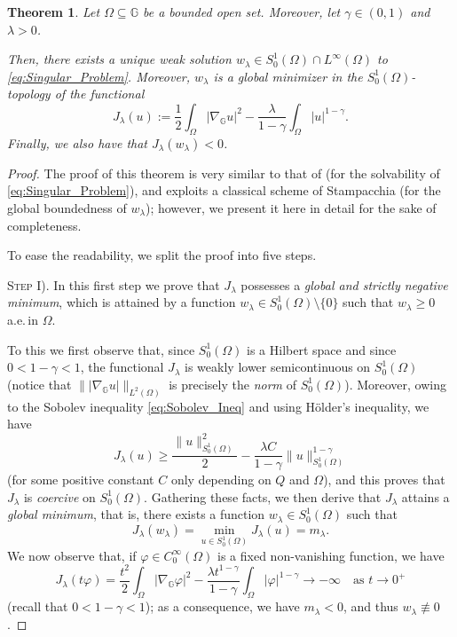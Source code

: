 \documentclass[11pt]{amsart}
\numberwithin{equation}{section} %
\newtheorem{teo}{Theorem}[section]
\theoremstyle{definition}
\begin{document}
\begin{teo}\label{thm:Singular_Problem}
	Let $\Omega\subseteq\mathbb{G}$
	be a bounded open set. Moreover, let $\gamma \in (0,1)$ and $\lambda >0$. 
	
	Then, there exists a unique weak solution $w_{\lambda} \in S^{1}_{0}(\Omega) \cap L^{\infty}(\Omega)$ to \eqref{eq:Singular_Problem}. Moreover, $w_{\lambda}$ is a global minimizer in the $S^{1}_{0}(\Omega)$-topology
	of the functional 
		\begin{equation}\label{eq:def_Functional_Singular}
			J_{\lambda}(u):= \dfrac{1}{2}\int_{\Omega}|\nabla_{\mathbb{G}}u|^{2} 
			-\dfrac{\lambda}{1-\gamma} \int_{\Omega}|u|^{1-\gamma}.
		\end{equation}
		Finally, we also have that $J_{\lambda}(w_{\lambda})<0$.
   \end{teo}
		\begin{proof}
		The proof of this theorem is very similar
		to that of  \cite[Theorem 1.1]{SunWuLong} (for the  solvability of
		\eqref{eq:Singular_Problem}), and exploits a classical scheme of Stampacchia (for the
		global boundedness of $w_\lambda$); however, we present it
		here in detail for the sake of completeness.
		
			To ease the readability, we split the proof into five steps.
			\medskip
			
			\textsc{Step I).} In this first step we prove that $J_\lambda$ possesses a 
			\emph{global and strictly negative minimum}, which is attained by
			a function $w_\lambda\in S_0^1(\Omega)\setminus\{0\}$ 
			such that $w_\lambda \geq 0$ a.e.\,in $\Omega$.
			\vspace*{0.1cm}

			To this we first observe that, since $S_0^1(\Omega)$ is a Hilbert
			space and since $0<1-\gamma<1$, the functional $J_\lambda$ is weakly
			lower semicontinuous on $S_0^1(\Omega)$ (notice that $\||\nabla_\mathbb{G}u|\|_{L^2(\Omega)}$
			is precisely the \emph{norm} of $S_0^1(\Omega)$). Moreover, owing to the Sobolev inequality
			\eqref{eq:Sobolev_Ineq} and using H\"older's inequality, we have
			\begin{equation*}
				J_{\lambda}(u) \geq  \dfrac{\|u\|^{2}_{S^{1}_{0}(\Omega)}}{2} - 
				\dfrac{\lambda C}{1-\gamma}\|u\|^{1-\gamma}_{S^{1}_{0}(\Omega)}
			\end{equation*}
			(for some positive constant $C$ only depending on $Q$ and $\Omega$),
			and this proves that $J_\lambda$ is \emph{coercive} on $S_0^1(\Omega)$.
			Gathering these facts, we then derive that 
			$J_\lambda$
			attains a \emph{global minimum}, that is, there exists 
			a function $w_\lambda\in S_0^1(\Omega)$
			such that
			$$J_\lambda(w_\lambda) = \min_{u\in S_0^1(\Omega)}J_\lambda(u)=m_\lambda.$$
			We now observe that, if $\varphi\in C_0^\infty(\Omega)$ is a fixed non-vanishing 
			function, we have
			$$J_\lambda(t\varphi) = \frac{t^2}{2}\int_{\Omega}|\nabla_{\mathbb{G}}\varphi|^{2} 
			-\dfrac{\lambda t^{1-\gamma}}{1-\gamma} \int_{\Omega}|\varphi|^{1-\gamma}\to-\infty
			\quad\text{as $t\to0^+$}$$
			(recall that $0<1-\gamma<1$); as a consequence, we have
			 $m_\lambda < 0$, and thus $w_\lambda\not\equiv 0$.


\end{proof}
\end{document}
